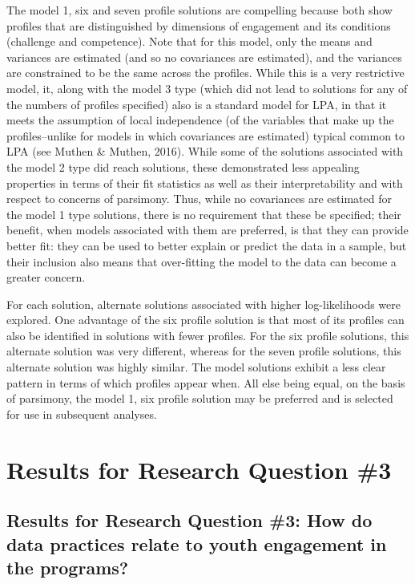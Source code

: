 \documentclass[]{book}
\theoremstyle{definition}
\theoremstyle{definition}
\theoremstyle{definition}
\theoremstyle{remark}
\begin{document}
The model 1, six and seven profile solutions are compelling because both
show profiles that are distinguished by dimensions of engagement and its
conditions (challenge and competence). Note that for this model, only
the means and variances are estimated (and so no covariances are
estimated), and the variances are constrained to be the same across the
profiles. While this is a very restrictive model, it, along with the
model 3 type (which did not lead to solutions for any of the numbers of
profiles specified) also is a standard model for LPA, in that it meets
the assumption of local independence (of the variables that make up the
profiles--unlike for models in which covariances are estimated) typical
common to LPA (see Muthen \& Muthen, 2016). While some of the solutions
associated with the model 2 type did reach solutions, these demonstrated
less appealing properties in terms of their fit statistics as well as
their interpretability and with respect to concerns of parsimony. Thus,
while no covariances are estimated for the model 1 type solutions, there
is no requirement that these be specified; their benefit, when models
associated with them are preferred, is that they can provide better fit:
they can be used to better explain or predict the data in a sample, but
their inclusion also means that over-fitting the model to the data can
become a greater concern.

For each solution, alternate solutions associated with higher
log-likelihoods were explored. One advantage of the six profile solution
is that most of its profiles can also be identified in solutions with
fewer profiles. For the six profile solutions, this alternate solution
was very different, whereas for the seven profile solutions, this
alternate solution was highly similar. The model solutions exhibit a
less clear pattern in terms of which profiles appear when. All else
being equal, on the basis of parsimony, the model 1, six profile
solution may be preferred and is selected for use in subsequent
analyses.

\chapter{Results for Research Question
\#3}\label{results-for-research-question-3}

\section{Results for Research Question \#3: How do data practices relate
to youth engagement in the
programs?}\label{results-for-research-question-3-how-do-data-practices-relate-to-youth-engagement-in-the-programs}
\end{document}
